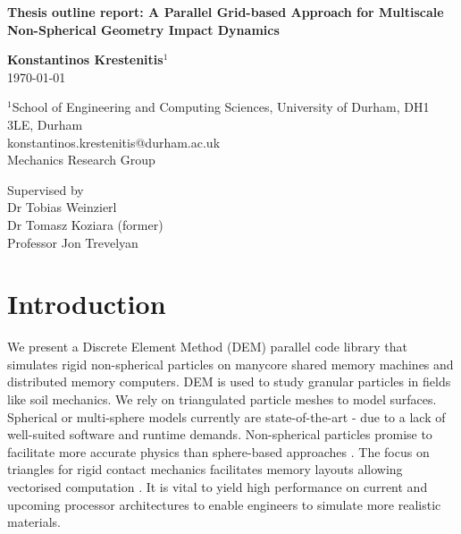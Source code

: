 \documentclass[times,12pt]{article}
\begin{document}
\pagestyle{plain}

\begin{center}
{\fontsize{22}{20}\bf Thesis outline report: A Parallel Grid-based Approach for Multiscale Non-Spherical Geometry Impact Dynamics\\
}\end{center}

\vspace{\fill}
\begin{center}\fontsize{16}{20}
\textbf{Konstantinos Krestenitis$^1$}\\
\today
\end{center}
\vspace{\fill}

\begin{center}
{\fontsize{10}{12}
}\end{center}

\begin{center}
$^1$School of Engineering and Computing Sciences, University of Durham, DH1 3LE, Durham\\
konstantinos.krestenitis@durham.ac.uk\\
Mechanics Research Group\\
\end{center}
\begin{center}
Supervised by\\
Dr Tobias Weinzierl\\
Dr Tomasz Koziara (former)\\
Professor Jon Trevelyan\\
\end{center}

\clearpage

\tableofcontents

\clearpage

\section{Introduction}
We present a Discrete Element Method (DEM) parallel code library that simulates rigid non-spherical particles on manycore shared memory machines and distributed memory computers. DEM is used to study granular particles in fields like soil mechanics. We rely on triangulated particle meshes to model surfaces. Spherical or multi-sphere models currently are state-of-the-art - due to a lack of well-suited software and runtime demands. Non-spherical particles promise to facilitate more accurate physics than sphere-based approaches \cite{AlonsoMarroqu2013}. The focus on triangles for rigid contact mechanics facilitates memory layouts allowing vectorised computation \cite{Alvarez2007, Koziara2005}. It is vital to yield high performance on current and upcoming processor architectures to enable engineers to simulate more realistic materials.
\end{document}
